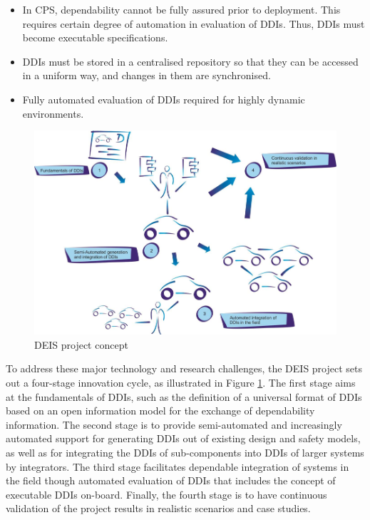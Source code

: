 \begin{enumerate}
		\begin{itemize}
			\item In CPS, dependability cannot be fully assured prior to deployment. This requires certain degree of automation in evaluation of DDIs. Thus, DDIs must become executable specifications.
			\item DDIs must be stored in a centralised repository so that they can be accessed in a uniform way, and changes in them are synchronised.
			\item Fully automated evaluation of DDIs required for highly dynamic environments.
		\end{itemize}
\end{enumerate}

\begin{figure}[ht!]
	\centering
	\includegraphics[width=1\linewidth]{./fig/proj_concept.png}
	\caption{DEIS project concept}
	\label{fig:proj_concept}
\end{figure}

To address these major technology and research challenges, the DEIS project sets out a four-stage innovation cycle, as illustrated in Figure \ref{fig:proj_concept}. The first stage aims at the fundamentals of DDIs, such as the definition of a universal format of DDIs based on an open information model for the exchange of dependability information. The second stage is to provide semi-automated and increasingly automated support for generating DDIs out of existing design and safety models, as well as for integrating the DDIs of sub-components into DDIs of larger systems by integrators. The third stage facilitates dependable integration of systems in the field though automated evaluation of DDIs that includes the concept of executable DDIs on-board. Finally, the fourth stage is to have continuous validation of the project results in realistic scenarios and case studies.



